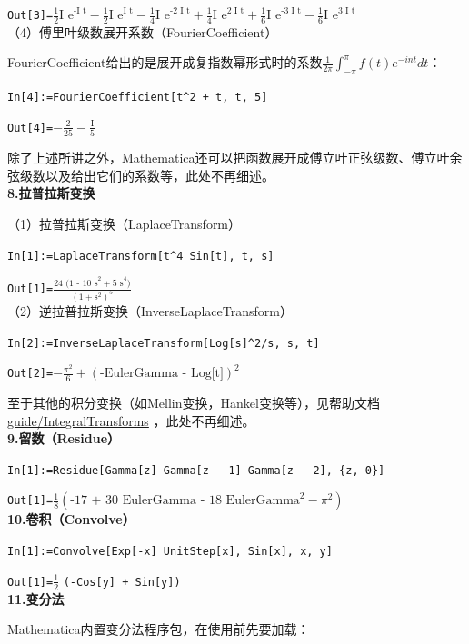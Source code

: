 \documentclass[UTF8,a4paper,10pt]{ctexart}
\newcommand{\mma}{Mathematica}
\begin{document}
\verb|Out[3]=|$\frac{1}{2} \text{I e}^{\text{-I t}}-\frac{1}{2} \text{I e}^\text{I t}-\frac{1}{4} \text{I e}^\text{-2 I t}+\frac{1}{4} \text{I e}^\text{2 I t}+\frac{1}{6} \text{I e}^\text{-3 I t}-\frac{1}{6} \text{I e}^\text{3 I t}$
\\

（4）傅里叶级数展开系数（FourierCoefficient）

FourierCoefficient给出的是展开成复指数幂形式时的系数$\frac{1}{2 \pi } \int_{-\pi }^{\pi } f(t) e^{-i n t} dt$：

\verb|In[4]:=FourierCoefficient[t^2 + t, t, 5]|

\verb|Out[4]=|$-\frac{2}{25}-\frac{\text{I}}{5}$

除了上述所讲之外，Mathematica还可以把函数展开成傅立叶正弦级数、傅立叶余弦级数以及给出它们的系数等，此处不再细述。
\\

\textbf{8.拉普拉斯变换}

（1）拉普拉斯变换（LaplaceTransform）

\verb|In[1]:=LaplaceTransform[t^4 Sin[t], t, s]|


\verb|Out[1]=|$\frac{\text{24 (1 - 10 s}^2 + \text{5 s}^4)}{(1 + \text{s}^2)^5}$
\\

（2）逆拉普拉斯变换（InverseLaplaceTransform）

\verb|In[2]:=InverseLaplaceTransform[Log[s]^2/s, s, t]|

\verb|Out[2]=|$-\frac{\pi^2}{6}+(\text{-EulerGamma - Log[t]})^2$

至于其他的积分变换（如Mellin变换，Hankel变换等），见帮助文档
\href{http://reference.wolfram.com/language/guide/IntegralTransforms.html}{guide/IntegralTransforms}
，此处不再细述。
\\

\textbf{9.留数（Residue）}

\verb|In[1]:=Residue[Gamma[z] Gamma[z - 1] Gamma[z - 2], {z, 0}]|

\verb|Out[1]=|$\frac{1}{8} (\text{-17 + 30 EulerGamma - 18 EulerGamma}^2 - \pi^2)$
\\

\textbf{10.卷积（Convolve）}

\verb|In[1]:=Convolve[Exp[-x] UnitStep[x], Sin[x], x, y]|

\verb|Out[1]=|$\frac{1}{2}$ \verb|(-Cos[y] + Sin[y])|
\\

\textbf{11.变分法}


\mma 内置变分法程序包，在使用前先要加载：
\end{document}
